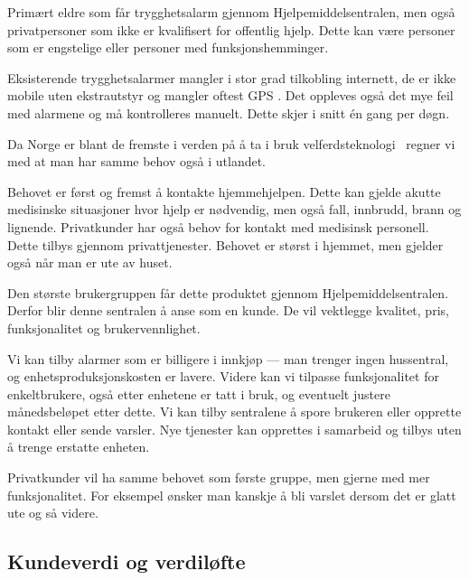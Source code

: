 
Primært eldre som får trygghetsalarm gjennom Hjelpemiddelsentralen, men også
privatpersoner som ikke er kvalifisert for offentlig hjelp. Dette kan være
personer som er engstelige eller personer med funksjonshemminger.

Eksisterende trygghetsalarmer mangler i stor grad tilkobling internett, de er
ikke mobile uten ekstrautstyr og mangler oftest GPS \cite{sverige.alarm}.
Det oppleves også det mye feil med alarmene og må kontrolleres manuelt. Dette
skjer i snitt én gang per døgn.

Da Norge er blant de fremste i verden på å ta i bruk velferdsteknologi
\cite{telenor.undersokelse} regner vi med at man har samme behov også i
utlandet.

Behovet er først og fremst å kontakte hjemmehjelpen. Dette kan gjelde akutte
medisinske situasjoner hvor hjelp er nødvendig, men også fall, innbrudd, brann
og lignende. Privatkunder har også behov for kontakt med medisinsk personell.
Dette tilbys gjennom privattjenester. Behovet er størst i hjemmet, men gjelder
også når man er ute av huset.

Den største brukergruppen får dette produktet gjennom Hjelpemiddelsentralen.
Derfor blir denne sentralen å anse som en kunde. De vil vektlegge kvalitet,
pris, funksjonalitet og brukervennlighet.

Vi kan tilby alarmer som er billigere i innkjøp --- man trenger ingen
hussentral, og enhetsproduksjonskosten er lavere. Videre kan vi tilpasse
funksjonalitet for enkeltbrukere, også etter enhetene er tatt i bruk, og
eventuelt justere månedsbeløpet etter dette. Vi kan tilby sentralene å spore
brukeren eller opprette kontakt eller sende varsler.  Nye tjenester kan
opprettes i samarbeid og tilbys uten å trenge erstatte enheten.

Privatkunder vil ha samme behovet som første gruppe, men gjerne med mer
funksjonalitet. For eksempel ønsker man kanskje å bli varslet dersom det er
glatt ute og så videre.

\subsection{Kundeverdi og verdiløfte}


